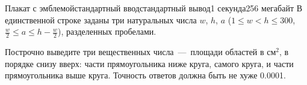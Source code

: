 \begin{problem}{Плакат с эмблемой}{стандартный ввод}{стандартный вывод}{1 секунда}{256 мегабайт}
\InputFile
В единственной строке заданы три натуральных числа $w$, $h$, $a$ ($1\leq w<h \leq 300$, $\frac{w}{2}\leq a \leq h-\frac{w}{2}$), разделенных пробелами.

\OutputFile
Построчно выведите три вещественных числа~--- площади областей в $\mbox{см}^2$, в порядке снизу вверх: части прямоугольника ниже круга, самого круга, и части прямоугольника выше круга. Точность ответов должна быть не хуже 0.0001.

\Example

\begin{example}
%
\end{example}

\end{problem}

